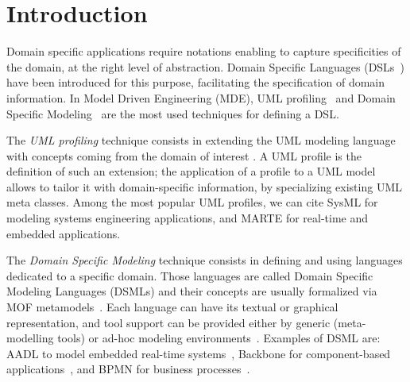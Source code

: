\section{Introduction}\label{sec:intro}

Domain specific applications require notations enabling to capture specificities of the domain, at the right level of abstraction. Domain Specific Languages (DSLs~\cite{FowlerBook}) have been introduced for this purpose, facilitating the specification of domain information. In Model Driven Engineering (MDE), UML profiling~\cite{UML} and Domain Specific Modeling~\cite{DSML} are the most used techniques for defining a DSL.

The \textit{UML profiling} technique consists in extending the UML modeling language with concepts coming from
the domain of interest \cite{UMLprofile}.
A UML profile is the definition of such an extension; the application of a profile to a UML model allows to tailor it with domain-specific information, by specializing existing UML meta classes. Among the most popular UML profiles, we can cite SysML \cite{sysml}
for modeling systems engineering applications, and MARTE \cite{marte} for real-time and embedded applications.

The \textit{Domain Specific Modeling} technique consists in defining and using languages dedicated to a specific domain.
Those languages are called Domain Specific Modeling Languages (DSMLs) and their concepts are usually formalized  via MOF metamodels~\cite{MOF}.
Each language can have its textual or graphical representation, and tool support can be provided either by generic (meta-modelling tools) or
ad-hoc modeling environments~\cite{DSML}.
Examples of DSML are: AADL to model embedded real-time systems~\cite{aadl}, Backbone for component-based applications~\cite{backbone},
and BPMN for business processes~\cite{BPMN}.


